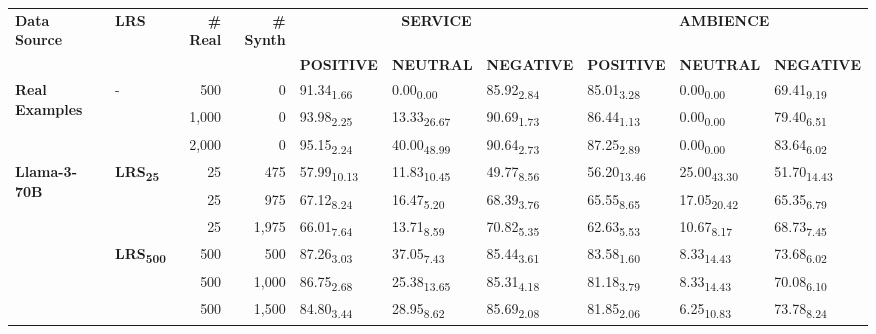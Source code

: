 \begin{table}[H]
\begin{subtable}{\linewidth}
{\begin{tabular}{llrrllllll}
\hline
\textbf{Data Source} & \textbf{LRS} & \textbf{\# Real} & \textbf{\# Synth} & \multicolumn{3}{c}{\textbf{SERVICE}} & \multicolumn{3}{c}{\textbf{AMBIENCE}}                        \\
                     &              &                 &                  & \textbf{POSITIVE}             & \textbf{NEUTRAL}            & \textbf{NEGATIVE}            & \textbf{POSITIVE} & \textbf{NEUTRAL} & \textbf{NEGATIVE} \\ \hline
\multirow{3}{*}{\textbf{Real Examples}} & \multirow{3}{*}{-} & 500 & 0 & 91.34\textsubscript{1.66} & 0.00\textsubscript{0.00} & 85.92\textsubscript{2.84} & 85.01\textsubscript{3.28} & 0.00\textsubscript{0.00} & 69.41\textsubscript{9.19} \\
 &  & 1,000 & 0 & 93.98\textsubscript{2.25} & 13.33\textsubscript{26.67} & 90.69\textsubscript{1.73} & 86.44\textsubscript{1.13} & 0.00\textsubscript{0.00} & 79.40\textsubscript{6.51} \\
 &  & 2,000 & 0 & 95.15\textsubscript{2.24} & 40.00\textsubscript{48.99} & 90.64\textsubscript{2.73} & 87.25\textsubscript{2.89} & 0.00\textsubscript{0.00} & 83.64\textsubscript{6.02} \\
\hline
\multirow{6}{*}{\textbf{Llama-3-70B}} & \multirow{3}{*}{\textbf{LRS\textsubscript{25}}} & 25 & 475 & 57.99\textsubscript{10.13} & 11.83\textsubscript{10.45} & 49.77\textsubscript{8.56} & 56.20\textsubscript{13.46} & 25.00\textsubscript{43.30} & 51.70\textsubscript{14.43} \\
 &  & 25 & 975 & 67.12\textsubscript{8.24} & 16.47\textsubscript{5.20} & 68.39\textsubscript{3.76} & 65.55\textsubscript{8.65} & 17.05\textsubscript{20.42} & 65.35\textsubscript{6.79} \\
 &  & 25 & 1,975 & 66.01\textsubscript{7.64} & 13.71\textsubscript{8.59} & 70.82\textsubscript{5.35} & 62.63\textsubscript{5.53} & 10.67\textsubscript{8.17} & 68.73\textsubscript{7.45} \\
\arrayrulecolor{gray}\cline{2-10}\arrayrulecolor{black}
 & \multirow{3}{*}{\textbf{LRS\textsubscript{500}}} & 500 & 500 & 87.26\textsubscript{3.03} & 37.05\textsubscript{7.43} & 85.44\textsubscript{3.61} & 83.58\textsubscript{1.60} & 8.33\textsubscript{14.43} & 73.68\textsubscript{6.02} \\
 &  & 500 & 1,000 & 86.75\textsubscript{2.68} & 25.38\textsubscript{13.65} & 85.31\textsubscript{4.18} & 81.18\textsubscript{3.79} & 8.33\textsubscript{14.43} & 70.08\textsubscript{6.10} \\
 &  & 500 & 1,500 & 84.80\textsubscript{3.44} & 28.95\textsubscript{8.62} & 85.69\textsubscript{2.08} & 81.85\textsubscript{2.06} & 6.25\textsubscript{10.83} & 73.78\textsubscript{8.24} \\

\end{tabular}}
\end{subtable}
\end{table}
